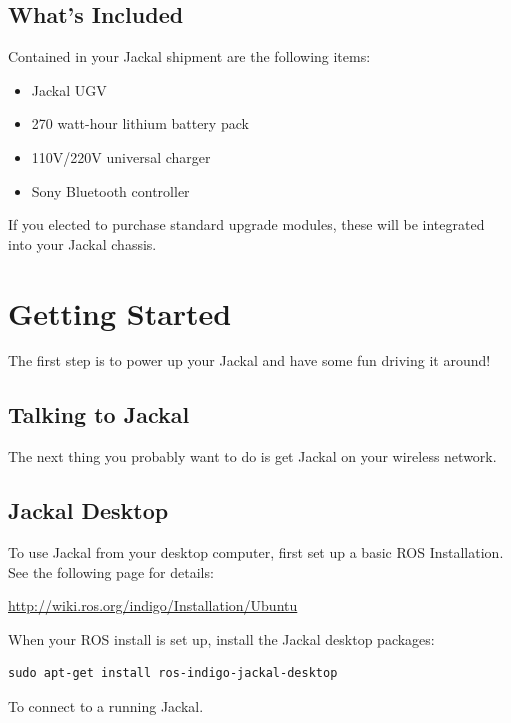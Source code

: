 \documentclass[]{article}
\begin{document}
\subsection{What's Included}

Contained in your Jackal shipment are the following items:

\begin{itemize}
  \item Jackal UGV
  \item 270 watt-hour lithium battery pack
  \item 110V/220V universal charger
  \item Sony Bluetooth controller
\end{itemize}

If you elected to purchase standard upgrade modules, these will be integrated into your Jackal chassis.

\section{Getting Started}

The first step is to power up your Jackal and have some fun driving it around!

\subsection{Talking to Jackal}

The next thing you probably want to do is get Jackal on your wireless network.

\subsection{Jackal Desktop}

To use Jackal from your desktop computer, first set up a basic ROS Installation. See the following
page for details:

\url{http://wiki.ros.org/indigo/Installation/Ubuntu}

When your ROS install is set up, install the Jackal desktop packages:

\begin{lstlisting}
sudo apt-get install ros-indigo-jackal-desktop
\end{lstlisting}

To connect to a running Jackal.
\end{document}

